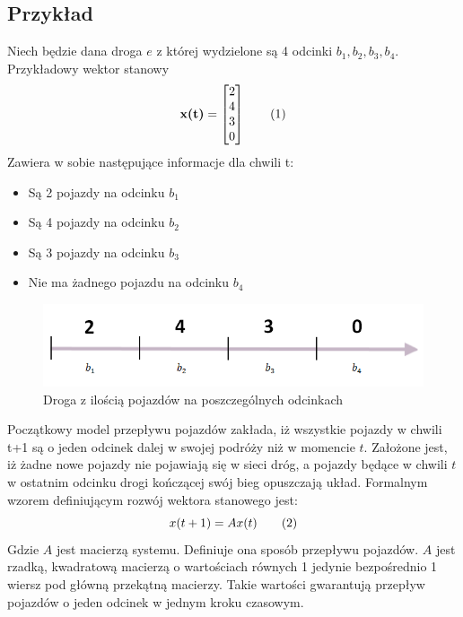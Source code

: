 \documentclass[12pt]{book}
\theoremstyle{plain}
\newcommand\addtag{\refstepcounter{equation}
\renewcommand{\labelenumii}{\theenumii}
\renewcommand{\theenumii}{\theenumi.\arabic{enumii}.}
\tag{\theequation}}
\begin{document}
\subsection{Przykład} \label{subsec:example-single-road}
Niech będzie dana droga $e$ z której wydzielone są 4 odcinki ${b_1,b_2,b_3,b_4}$. Przykładowy wektor stanowy
\[\textbf{x(t)}=\begin{bmatrix}
2 \\ 4 \\ 3 \\ 0
\end{bmatrix} \addtag \]
Zawiera w sobie następujące informacje dla chwili t:
\begin{itemize}
	\item Są 2 pojazdy na odcinku $b_1$
	\item Są 4 pojazdy na odcinku $b_2$
	\item Są 3 pojazdy na odcinku $b_3$
	\item Nie ma żadnego pojazdu na odcinku $b_4$
\end{itemize}

\begin{figure}[H]
	\centering
	\includegraphics[width=14cm]{single_road_example}
	\caption{Droga z ilością pojazdów na poszczególnych odcinkach}
	\label{fig:single_road}
\end{figure}

Początkowy model przepływu pojazdów zakłada, iż wszystkie pojazdy w chwili t+1 są o jeden odcinek dalej w swojej podróży niż w momencie $t$. Założone jest, iż żadne nowe pojazdy nie pojawiają się w sieci dróg, a pojazdy będące w chwili $t$ w ostatnim odcinku drogi kończącej swój bieg opuszczają układ. Formalnym wzorem definiującym rozwój wektora stanowego jest:
\[x(t+1)=Ax(t) \addtag \label{eq:single_road} \]
Gdzie $A$ jest macierzą systemu. Definiuje ona sposób przepływu pojazdów. $A$ jest rzadką, kwadratową macierzą o wartościach równych 1 jedynie bezpośrednio 1 wiersz pod główną przekątną macierzy. Takie wartości gwarantują przepływ pojazdów o jeden odcinek w jednym kroku czasowym.
\end{document}
